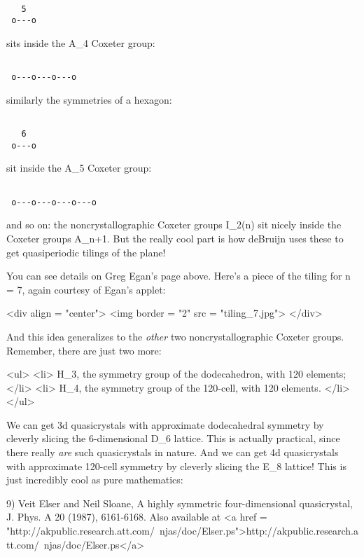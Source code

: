 \begin{verbatim}

   5
 o---o
\end{verbatim}
    
sits inside the A_{4} Coxeter group:


\begin{verbatim}

 o---o---o---o
\end{verbatim}
    
similarly the symmetries of a hexagon:


\begin{verbatim}

   6
 o---o  
\end{verbatim}
    
sit inside the A_{5} Coxeter group:


\begin{verbatim}

 o---o---o---o---o
\end{verbatim}
    
and so on: the noncrystallographic Coxeter groups I_{2}(n)
sit nicely inside the Coxeter groups A_{n+1}.  But the really
cool part is how deBruijn uses these to get quasiperiodic tilings of
the plane!  

You can see details on Greg Egan's page above.  
Here's a piece of the tiling for n = 7, again courtesy of Egan's
applet:

<div align = "center">
<img border = "2" src = "tiling_7.jpg">
</div>

And this idea generalizes to the \emph{other} two
noncrystallographic Coxeter groups.  Remember, there are just two
more:

<ul>
<li>
H_{3}, the symmetry group of the dodecahedron, with 120 elements;
</li>
<li>
H_{4}, the symmetry group of the 120-cell, with 120  elements.
</li>
</ul>

We can get 3d quasicrystals with approximate dodecahedral symmetry by
cleverly slicing the 6-dimensional D_{6} lattice.  This is
actually practical, since there really \emph{are} such quasicrystals
in nature.  And we can get 4d quasicrystals with approximate 120-cell
symmetry by cleverly slicing the E_{8} lattice!  This is just
incredibly cool as pure mathematics:

9) Veit Elser and Neil Sloane, A highly symmetric four-dimensional
quasicrystal, J. Phys. A 20 (1987), 6161-6168.
Also available at <a href = "http://akpublic.research.att.com/~njas/doc/Elser.ps">http://akpublic.research.att.com/~njas/doc/Elser.ps</a>  

